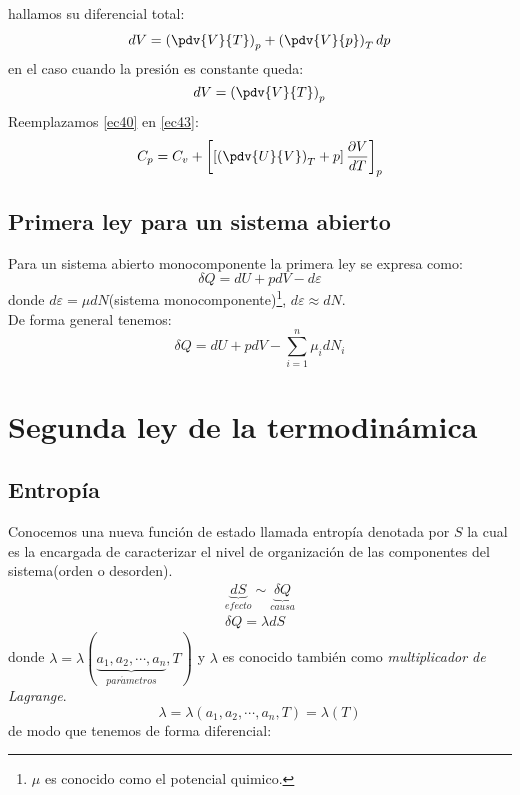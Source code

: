 \documentclass[../main]{subfiles}
\begin{document}
\begin{enumerate}
          hallamos su diferencial total:
          \begin{align}
              dV=\left(\pdv{V}{T}\right)_p+\left(\pdv{V}{p}\right)_T dp
          \end{align}
          en el caso cuando la presión es constante queda:
          \begin{equation}
              dV=\left( \pdv{V}{T}\right)_p
              \label{ec43}
          \end{equation}
          Reemplazamos \eqref{ec40} en \eqref{ec43}:
          \begin{equation}
              C_p=C_v+\left[ \left[\left(\pdv{U}{V}\right)_T+p\right]\dfrac{\partial V}{dT}\right]_p
          \end{equation}
\end{enumerate}
\section{Primera ley para un sistema abierto}
Para un sistema abierto monocomponente la primera ley se expresa como:
\begin{equation}
    \delta Q=dU+pdV-d \varepsilon
\end{equation}
donde $d \varepsilon= \mu dN$(sistema monocomponente)\footnote{$\mu$ es conocido como el potencial quimico.}, $d \varepsilon \approx dN$. \\
De forma general tenemos:
\begin{equation}
    \delta Q = dU+pdV-\sum_{i=1}^n \mu_i dN_i
\end{equation}
\chapter{Segunda ley de la termodinámica}
\section{Entropía}
Conocemos una nueva función de estado llamada entropía denotada por $S$ la cual es la encargada de caracterizar el nivel de organización de las componentes del sistema(orden o desorden).
\begin{align}
    \underbrace{dS}_{efecto}\sim \underbrace{\delta Q}_{causa} \\
    \delta Q= \lambda dS
\end{align}
donde $\lambda=\lambda(\underbrace{a_1,a_2, \cdots, a_n}_{par\acute{a}metros}, T)$ y $\lambda$ es conocido también como \textit{multiplicador de Lagrange}.
\begin{equation}
    \lambda = \lambda(a_1,a_2,\cdots, a_n,T)=\lambda(T)
\end{equation}
de modo que tenemos de forma diferencial:
\end{document}
